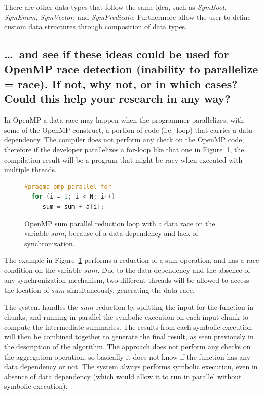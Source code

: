 \begin{refsection}
There are other data types that follow the same idea, such as \emph{SymBool},
\emph{SymEnum}, \emph{SymVector}, and \emph{SymPredicate}. Furthermore \symp
allow the user to define custom data structures through composition of data
types.

\subsection{\dots~and see if these ideas could be used
  for OpenMP race detection (inability to parallelize = race).
  If not, why not, or in which cases?
  Could this help your research in any way?}
\label{sec:member12}

In OpenMP a data race may happen when the programmer parallelizes, with some
of the OpenMP construct, a portion of code (i.e.\ loop) that carries a data
dependency.
%
The compiler does not perform any check on the OpenMP code, therefore if the
developer parallelizes a for-loop like that one in Figure~\ref{fig:race1}, the
compilation result will be a program that might be racy when executed with
multiple threads.
%
\begin{figure}
\begin{lstlisting}[language=C]
  #pragma omp parallel for
  for (i = 1; i < N; i++)
     sum = sum + a[i];
\end{lstlisting}
\caption{OpenMP sum parallel reduction loop with a data race on the variable
  $sum$, because of a data dependency and lack of synchronization.}
\label{fig:race1}
\end{figure}
%
The example in Figure~\ref{fig:race1} performs a reduction of a sum operation,
and has a race condition on the variable $sum$.
%
%
Due to the data dependency and the absence of any synchronization mechanism,
two different threads will be allowed to access the location of $sum$
simultaneously, generating the data race.

The system \symp handles the $sum$ reduction by splitting the input for the
function in chunks, and running in parallel the symbolic execution on each
input chunk to compute the intermediate summaries.
%
The results from each symbolic execution will then be combined together to
generate the final result, as seen previously in the description of the
algorithm.
%
The \symp approach does not perform any checks on the aggregation operation,
so basically it does not know if the function has any data dependency or not.
%
The system always performs symbolic execution, even in absence of data
dependency (which would allow it to run in parallel without symbolic
execution).


\end{refsection}
